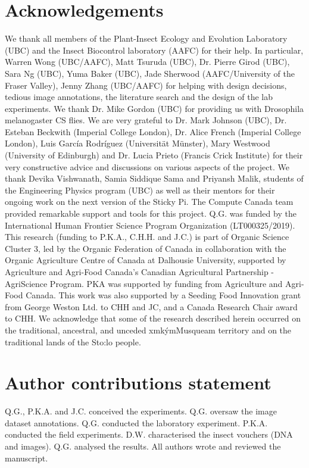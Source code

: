 \documentclass[fleqn,10pt]{wlscirep}
\newcommand{\musqueam}{x\super{w}m\textschwa{}\texttheta{}k\super{w}\textschwa{}\'{y}\textschwa{}m}
\begin{document}
\section*{Acknowledgements}
{
	
We thank all members of the Plant-Insect Ecology and Evolution Laboratory (UBC) and the Insect Biocontrol laboratory (AAFC) for their help. In particular, Warren Wong (UBC/AAFC), Matt Tsuruda (UBC), Dr. Pierre Girod (UBC), Sara Ng (UBC), Yuma Baker (UBC), Jade Sherwood (AAFC/University of the Fraser Valley), Jenny Zhang (UBC/AAFC) for helping with design decisions, tedious image annotations, the literature search and the design of the lab experiments. We thank Dr. Mike Gordon (UBC) for providing us with Drosophila melanogaster CS flies. We are very grateful to Dr. Mark Johnson (UBC), Dr. Esteban Beckwith (Imperial College London), Dr. Alice French (Imperial College London), Luis García Rodríguez (Universität Münster), Mary Westwood (University of Edinburgh) and Dr. Lucia Prieto (Francis Crick Institute) for their very constructive advice and discussions on various aspects of the project. We thank Devika Vishwanath, Samia Siddique Sama and Priyansh Malik, students of the Engineering Physics program (UBC) as well as their mentors for their ongoing work on the next version of the Sticky Pi. The Compute Canada team provided remarkable support and tools for this project. Q.G. was funded by the International Human Frontier Science Program Organization (LT000325/2019). This research (funding to P.K.A., C.H.H. and J.C.) is part of Organic Science Cluster 3, led by the Organic Federation of Canada in collaboration with the Organic Agriculture Centre of Canada at Dalhousie University, supported by Agriculture and Agri-Food Canada’s Canadian Agricultural Partnership - AgriScience Program. PKA was supported by funding from Agriculture and Agri-Food Canada. This work was also supported by a Seeding Food Innovation grant from George Weston Ltd. to CHH and JC, and a Canada Research Chair award to CHH. We acknowledge that some of the research described herein occurred on the traditional, ancestral, and unceded \musqueam Musqueam territory and on the traditional lands of the Sto:lo people.}

\section*{Author contributions statement}
Q.G., P.K.A. and J.C. conceived the experiments.
Q.G. oversaw the image dataset annotations.
Q.G. conducted the laboratory experiment. 
P.K.A. conducted the field experiments.
D.W. characterised the insect vouchers (DNA and images).
Q.G. analysed the results.
All authors wrote and reviewed the manuscript. 
\end{document}

